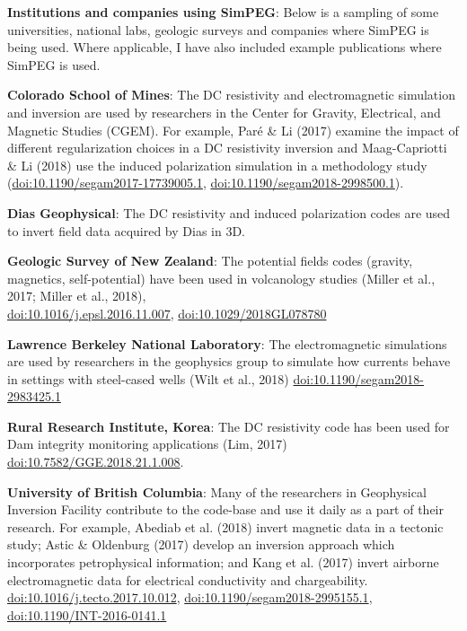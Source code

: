\documentclass[a4paper, 11pt]{article}
\newcommand{\doi}[1]{\href{https://doi.org/#1}{doi:#1}}
\begin{document}
\textbf{Institutions and companies using SimPEG}: Below is a sampling of some universities, national labs, geologic surveys and companies where SimPEG is being used. Where applicable, I have also included example publications where SimPEG is used.
\begin{myitemize}\vspace{0.3cm}
\item \textbf{Colorado School of Mines}: The DC resistivity and electromagnetic simulation and inversion are used by researchers in the Center for Gravity, Electrical, and Magnetic Studies (CGEM). For example, Par\'e \& Li (2017) examine the impact of different regularization choices in a DC resistivity inversion and Maag-Capriotti \& Li (2018) use the induced polarization simulation in a methodology study (\doi{10.1190/segam2017-17739005.1}, \doi{10.1190/segam2018-2998500.1}).

\item \textbf{Dias Geophysical}: The DC resistivity and induced polarization codes are used to invert field data acquired by Dias in 3D.

\item \textbf{Geologic Survey of New Zealand}: The potential fields codes (gravity, magnetics, self-potential) have been used in volcanology studies (Miller et al., 2017; Miller et al., 2018), \\ \doi{10.1016/j.epsl.2016.11.007}, \doi{10.1029/2018GL078780}

\item \textbf{Lawrence Berkeley National Laboratory}: The electromagnetic simulations are used by researchers in the geophysics group to simulate how currents behave in settings with steel-cased wells (Wilt et al., 2018) \doi{10.1190/segam2018-2983425.1}

\item \textbf{Rural Research Institute, Korea}: The DC resistivity code has been used for Dam integrity monitoring applications (Lim, 2017) \doi{10.7582/GGE.2018.21.1.008}.



\item \textbf{University of British Columbia}: Many of the researchers in Geophysical Inversion Facility contribute to the code-base and use it daily as a part of their research. For example, Abediab et al. (2018) invert magnetic data in a tectonic study; Astic \& Oldenburg (2017) develop an inversion approach which incorporates petrophysical information; and Kang et al. (2017) invert airborne electromagnetic data for electrical conductivity and chargeability. \doi{10.1016/j.tecto.2017.10.012}, \doi{10.1190/segam2018-2995155.1}, \doi{10.1190/INT-2016-0141.1}
\end{myitemize}\vspace{0.3cm}
\end{document}
